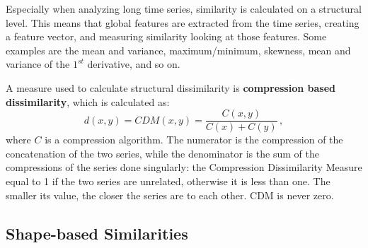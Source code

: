 Especially when analyzing long time series, similarity is calculated on a structural level. This means that global features are extracted from the time series, creating a feature vector, and measuring similarity looking at those features. Some examples are the mean and variance, maximum/minimum, skewness, mean and variance of the $1^{st}$ derivative, and so on.

A measure used to calculate structural dissimilarity is \textbf{compression based dissimilarity}, which is calculated as:
\begin{equation*}
    d(x,y) = \textit{CDM}(x,y) = \dfrac{C(x,y)}{C(x) + C(y)} \,,
\end{equation*}
where $C$ is a compression algorithm. The numerator is the compression of the concatenation of the two series, while the denominator is the sum of the compressions of the series done singularly: the Compression Dissimilarity Measure equal to 1 if the two series are unrelated, otherwise it is less than one. The smaller its value, the closer the series are to each other. CDM is never zero.

\subsection{Shape-based Similarities}


